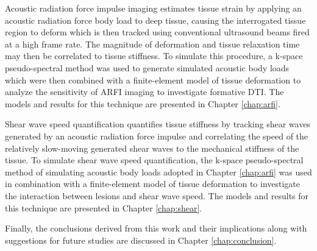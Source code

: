 		Acoustic radiation force impulse imaging estimates tissue strain by applying an acoustic radiation force body load to deep tissue, causing the interrogated tissue region to deform which is then tracked using conventional ultrasound beams fired at a high frame rate. The magnitude of deformation and tissue relaxation time may then be correlated to tissue stiffness. To simulate this procedure, a k-space pseudo-spectral method was used to generate simulated acoustic body loads which were then combined with a finite-element model of tissue deformation to analyze the sensitivity of ARFI imaging to investigate formative DTI. The models and results for this technique are presented in Chapter \ref{chap:arfi}.

		Shear wave speed quantification quantifies tissue stiffness by tracking shear waves generated by an acoustic radiation force impulse and correlating the speed of the relatively slow-moving generated shear waves to the mechanical stiffness of the tissue. To simulate shear wave speed quantification, the k-space pseudo-spectral method of simulating acoustic body loads adopted in Chapter \ref{chap:arfi} was used in combination with a finite-element model of tissue deformation to investigate the interaction between lesions and shear wave speed. The models and results for this technique are presented in Chapter \ref{chap:shear}.

		Finally, the conclusions derived from this work and their implications along with suggestions for future studies are discussed in Chapter \ref{chap:conclusion}.


